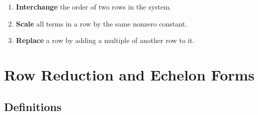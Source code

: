 \documentclass{article}
\begin{document}
\begin{enumerate}

\item
\textbf{Interchange} the order of two rows in the system.

\item
\textbf{Scale} all terms in a row by the same nonzero constant.

\item
\textbf{Replace} a row by adding a multiple of another row to it.

\end{enumerate}


\section{Row Reduction and Echelon Forms}


\subsection{Definitions}
\end{document}
